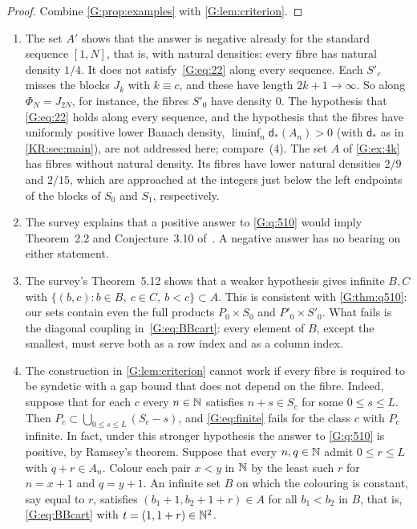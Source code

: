\begin{proof}
Combine \cref{G:prop:examples} with \cref{G:lem:criterion}.
\end{proof}


\begin{remark}\label{G:rem:q510}
\begin{enumerate}[label=\textup{(\arabic*)}]
\item The set $A'$ shows that the answer is negative already for the standard \Fol{}
sequence $[1,N]$, that is, with natural densities: every fibre has natural density $1/4$.
It does not satisfy~\eqref{G:eq:22} along every \Fol{} sequence. Each $S'_c$ misses the
blocks $J_k$ with $k\equiv c$, and these have length $2k+1\to\infty$. So along
$\Phi_N=J_{2N}$, for instance, the fibres $S'_0$ have density $0$. The hypothesis that
\eqref{G:eq:22} holds along every \Fol{} sequence, and the hypothesis that the fibres have
uniformly positive lower Banach density, $\liminf_n\mathsf d_*(A_n)>0$ (with $\mathsf d_*$ as in
\cref{KR:sec:main}), are not addressed here; compare~(4). The set $A$ of \cref{G:ex:4k} has fibres without natural density. Its fibres have
lower natural densities $2/9$ and $2/15$, which are approached at the integers just
below the left endpoints of the blocks of $S_0$ and $S_1$, respectively.
\item The survey explains that a positive answer to \cref{G:q:510} would imply
Theorem~2.2 and Conjecture~3.10 of~\cite{kra2023problems}. A negative answer has no
bearing on either statement.
\item The survey's Theorem~5.12 shows that a weaker hypothesis gives infinite $B,C$ with
$\{(b,c):b\in B,\ c\in C,\ b<c\}\subset A$. This is consistent with
\cref{G:thm:q510}: our sets contain even the full products $P_0\times S_0$ and
$P'_0\times S'_0$. What fails is the diagonal coupling in~\eqref{G:eq:BBcart}: every
element of $B$, except the smallest, must serve both as a row index and as a column index.
\item The construction in \cref{G:lem:criterion} cannot work if every fibre is required
to be syndetic with a gap bound that does not depend on the fibre. Indeed, suppose that for each $c$ every
$n\in\mathbb{N}$ satisfies $n+s\in S_c$ for some $0\le s\le L$. Then
$P_c\subset\bigcup_{0\le s\le L}(S_c-s)$, and \eqref{G:eq:finite} fails for the class $c$
with $P_c$ infinite. In fact, under this stronger hypothesis the answer to \cref{G:q:510} is
positive, by Ramsey's theorem. Suppose that every $n,q\in\mathbb{N}$ admit $0\le r\le L$ with
$q+r\in A_n$. Colour each pair $x<y$ in $\mathbb{N}$ by the least such $r$ for $n=x+1$ and $q=y+1$. An
infinite set $B$ on which the colouring is constant, say equal to $r$, satisfies
$(b_1+1,b_2+1+r)\in A$ for all $b_1<b_2$ in $B$, that is, \eqref{G:eq:BBcart} with
$t=(1,1+r)\in\mathbb{N}^2$.
\end{enumerate}
\end{remark}

